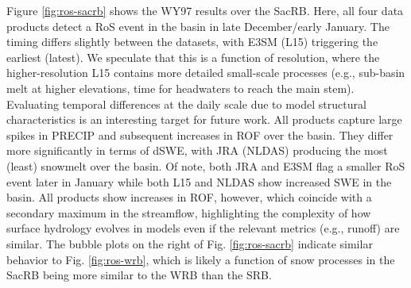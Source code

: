 \documentclass[nhess, manuscript]{copernicus}
\begin{document}
Figure \ref{fig:ros-sacrb} shows the WY97 results over the SacRB.
Here, all four data products detect a RoS event in the basin in late December/early January.
The timing differs slightly between the datasets, with E3SM (L15) triggering the earliest (latest).
We speculate that this is a function of resolution, where the higher-resolution L15 contains more detailed small-scale processes (e.g., sub-basin melt at higher elevations, time for headwaters to reach the main stem).
Evaluating temporal differences at the daily scale due to model structural characteristics is an interesting target for future work.
All products capture large spikes in PRECIP and subsequent increases in ROF over the basin.
They differ more significantly in terms of dSWE, with JRA (NLDAS) producing the most (least) snowmelt over the basin.
Of note, both JRA and E3SM flag a smaller RoS event later in January while both L15 and NLDAS show increased SWE in the basin.
All products show increases in ROF, however, which coincide with a secondary maximum in the streamflow, highlighting the complexity of how surface hydrology evolves in models even if the relevant metrics (e.g., runoff) are similar.
The bubble plots on the right of Fig. \ref{fig:ros-sacrb} indicate similar behavior to Fig. \ref{fig:ros-wrb}, which is likely a function of snow processes in the SacRB being more similar to the WRB than the SRB.
\end{document}
